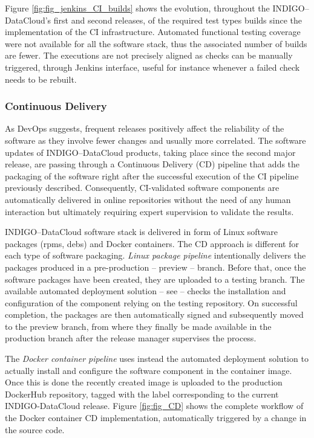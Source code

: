 \documentclass[journal]{IEEEtran}
\begin{document}
Figure \ref{fig:fig_jenkins_CI_builds} shows the evolution, throughout the 
INDIGO--DataCloud's first and second releases, of the required test types builds since the
implementation of the CI infrastructure. Automated functional testing coverage were not
available for all the software stack, thus the associated number of builds are fewer. The
executions are not precisely aligned as checks can be manually triggered, through Jenkins
interface, useful for instance whenever a failed check needs to be rebuilt.

\subsubsection{Continuous Delivery}
As DevOps suggests, frequent releases positively affect the reliability of the software as
they involve fewer changes and usually more correlated. The software updates of 
INDIGO--DataCloud products, taking place since the second major release, are passing through
a Continuous Delivery (CD) pipeline that adds the packaging of the software right after the
successful execution of the CI pipeline previously described. Consequently, CI-validated 
software components are automatically delivered in online repositories without the need of 
any human interaction but ultimately requiring expert supervision to validate the results.

INDIGO--DataCloud software stack is delivered in form of Linux software packages (rpms, debs) 
and Docker containers. The CD approach is different for each type of software packaging. \textit{Linux
package pipeline} intentionally delivers the packages produced in a pre-production -- preview --
branch. Before that, once the software packages have been created, they are uploaded to a 
testing branch. The available automated deployment solution -- see \cite{subsec:sqa} -- checks
the installation and configuration of the component relying on the testing repository. On 
successful completion, the packages are then automatically signed and subsequently moved to 
the preview branch, from where they finally be made available in the production branch after
the release manager supervises the process. 

The \textit{Docker container pipeline} uses instead the automated deployment solution to 
actually install and configure the software component in the container image. Once this is 
done the recently created image is uploaded to the production DockerHub repository, tagged
with the label corresponding to the current INDIGO-DataCloud release. Figure 
\ref{fig:fig_CD} shows the complete workflow of the Docker container CD implementation, 
automatically triggered by a change in the source code.
\end{document}

